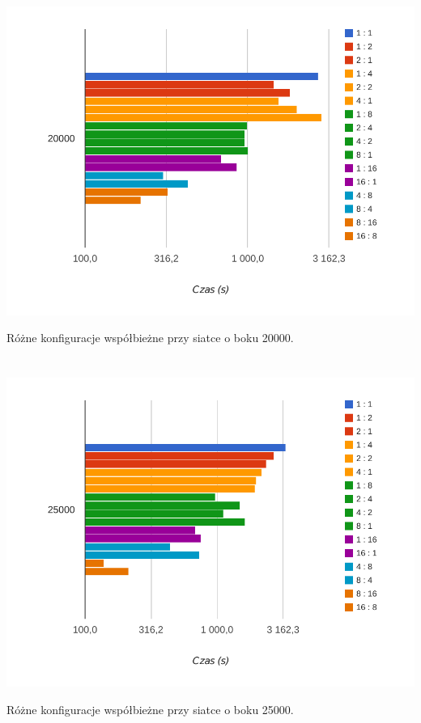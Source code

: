 \documentclass[paper=a4, fontsize=11pt]{scrartcl}	%
\numberwithin{equation}{section}		%
\numberwithin{figure}{section}			%
\numberwithin{table}{section}				%
\begin{document}
\begin{center}
\includegraphics[width=135mm]{report/time-20000.pdf}

Różne konfiguracje współbieżne przy siatce o boku 20000.
\\ \ \\ \ \\


\includegraphics[width=135mm]{report/time-25000.pdf}

Różne konfiguracje współbieżne przy siatce o boku 25000.
\\ \ \\ \ \\



\end{center}
\end{document}
